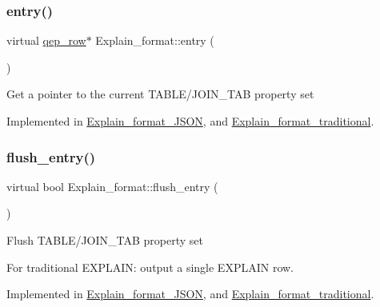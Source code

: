 \subsubsection{\texorpdfstring{entry()}{entry()}}
{\footnotesize\ttfamily virtual \mbox{\hyperlink{classqep__row}{qep\+\_\+row}}$\ast$ Explain\+\_\+format\+::entry (\begin{DoxyParamCaption}{ }\end{DoxyParamCaption})\hspace{0.3cm}{\ttfamily [pure virtual]}}

Get a pointer to the current T\+A\+B\+L\+E/\+J\+O\+I\+N\+\_\+\+T\+AB property set 

Implemented in \mbox{\hyperlink{classExplain__format__JSON_ab1c4bc5ad6055507a47057fe98ba55dc}{Explain\+\_\+format\+\_\+\+J\+S\+ON}}, and \mbox{\hyperlink{classExplain__format__traditional_a33fdef7dec07e61f4b0f098b768e01d9}{Explain\+\_\+format\+\_\+traditional}}.

\mbox{\label{classExplain__format_a3907382576a43a2fa4ed554f5d13e158}} 
\subsubsection{\texorpdfstring{flush\+\_\+entry()}{flush\_entry()}}
{\footnotesize\ttfamily virtual bool Explain\+\_\+format\+::flush\+\_\+entry (\begin{DoxyParamCaption}{ }\end{DoxyParamCaption})\hspace{0.3cm}{\ttfamily [pure virtual]}}

Flush T\+A\+B\+L\+E/\+J\+O\+I\+N\+\_\+\+T\+AB property set

For traditional E\+X\+P\+L\+A\+IN\+: output a single E\+X\+P\+L\+A\+IN row. 

Implemented in \mbox{\hyperlink{classExplain__format__JSON_adf08f2f20ae05ca772a621f6139be6aa}{Explain\+\_\+format\+\_\+\+J\+S\+ON}}, and \mbox{\hyperlink{classExplain__format__traditional_a991e2af5a82b9f25cee94564ee4c7000}{Explain\+\_\+format\+\_\+traditional}}.

\mbox{\label{classExplain__format_a91ab0cd859549a7df55746df2491ca60}} 
